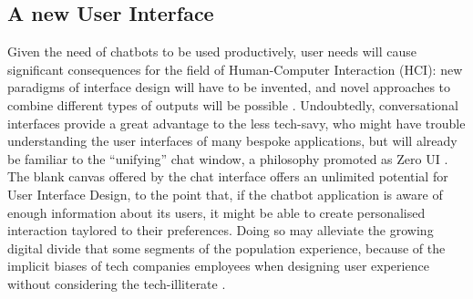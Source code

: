 \subsection{A new User Interface}
Given the need of chatbots to be used productively, user needs will cause significant consequences for the field of Human-Computer Interaction (HCI): new paradigms of interface design will have to be invented, and novel approaches to combine different types of outputs will be possible \cite{Følstad2017}. Undoubtedly, conversational interfaces provide a great advantage to the less tech-savy, who might have trouble understanding the user interfaces of many bespoke applications, but will already be familiar to the ``unifying'' chat window, a philosophy promoted as Zero UI \cite{zeroui}. The blank canvas offered by the chat interface offers an unlimited potential for User Interface Design, to the point that, if the chatbot application is aware of enough information about its users, it might be able to create personalised interaction taylored to their preferences. Doing so may alleviate the growing digital divide that some segments of the population experience, because of the implicit biases of tech companies employees when designing user experience without considering the tech-illiterate \cite{Brandtzaeg2011}.
